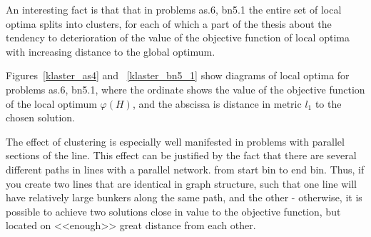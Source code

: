 \documentclass{ifacconf}
\begin{document}
An interesting fact is that
that in problems as.6, bn5.1 the entire set of local optima splits
into clusters, for each of which a part of the thesis about the tendency to
deterioration of the value of the objective function of local optima
with increasing distance to the global optimum.

Figures~\ref{klaster_as4} and ~\ref{klaster_bn5_1} show diagrams of local optima for problems
as.6, bn5.1, where the ordinate shows the value of the objective function of the local optimum $\varphi(H)$, and the abscissa is
distance in metric $l_1$ to the chosen solution.

The effect of clustering is especially well manifested in problems with parallel sections of the line.
This effect can be justified by the fact that there are several different paths in lines with a parallel network.
from start bin to end bin. Thus, if you create two lines that are identical in graph structure,
such that one line will have relatively large bunkers along the same path, and the other -
otherwise, it is possible to achieve two solutions close in value to the objective function, but located on <<enough>>
great distance from each other.
\end{document}
